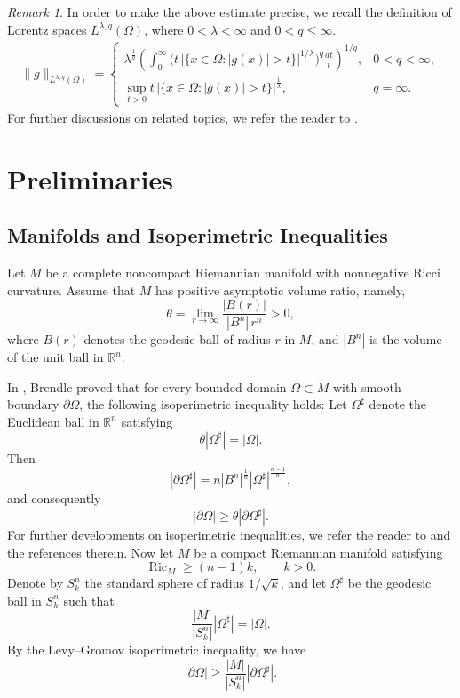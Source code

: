 \documentclass[11pt]{article}
\numberwithin{equation}{section}
\theoremstyle{definition}
\theoremstyle{remark}
\newtheorem{remark}[theorem]{Remark}
\begin{document}
\begin{remark}
In order to make the above estimate precise, 
we recall the definition of Lorentz spaces $L^{\lambda,q}(\Omega)$, 
where $0<\lambda<\infty$ and $0<q\le\infty$.
\begin{align*}
\|g\|_{L^{\lambda,q}(\Omega)}
=
\begin{cases}
  \lambda^{\frac{1}{q}}
\left(
\displaystyle \int_0^\infty
\big(t\,|\{x\in\Omega: |g(x)|>t\}|^{1/\lambda}\big)^q \frac{dt}{t}
\right)^{1/q}, & 0<q<\infty,\\[1em]
\sup_{t>0} t\,|\{x\in\Omega: |g(x)|>t\}|^\frac1\lambda, & q=\infty.
\end{cases}
\end{align*}
For further discussions on related topics, we refer the reader to
\cite{kaminska1990some,carro2007recent}.
\end{remark}
\section{Preliminaries}
\subsection{Manifolds and Isoperimetric Inequalities}
Let $M$ be a complete noncompact Riemannian manifold with nonnegative Ricci curvature. Assume that $M$ has positive asymptotic volume ratio, namely,
\begin{equation}
\theta
=
\lim_{r\to\infty}
\frac{|B(r)|}{|B^n|\,r^n}
>0,
\end{equation}
where $B(r)$ denotes the geodesic ball of radius $r$ in $M$, and $|B^n|$ is the volume of the unit ball in $\mathbb{R}^n$.

In \cite{brendle2023sobolev}, Brendle proved that for every bounded domain $\Omega\subset M$ with smooth boundary $\partial\Omega$, the following isoperimetric inequality holds:
Let $\Omega^\sharp$ denote the Euclidean ball in $\mathbb{R}^n$ satisfying
\[
\theta |\Omega^\sharp| = |\Omega|.
\]
Then
\[
|\partial \Omega^\sharp|
=
n|B^n|^{\frac1n}
|\Omega^\sharp|^{\frac{n-1}{n}},
\]
and consequently
\[
|\partial \Omega|
\ge
\theta |\partial \Omega^\sharp|.
\]
For further developments on isoperimetric inequalities, we refer the reader to
\cite{agostiniani2018sharp,cavalletti2017sharp,klartag2017needle}
and the references therein.
Now let $M$ be a compact Riemannian manifold satisfying
\[
\operatorname{Ric}_M \ge (n-1)k,
\qquad k>0.
\]
Denote by $S_k^n$ the standard sphere of radius $1/\sqrt{k}$, and let $\Omega^\sharp$ be the geodesic ball in $S_k^n$ such that
\[
\frac{|M|}{|S_k^n|}
|\Omega^\sharp|
=
|\Omega|.
\]
By the Levy--Gromov isoperimetric inequality\cite{gromov2007metric}, we have
\[
|\partial \Omega|
\ge
\frac{|M|}{|S_k^n|}
|\partial \Omega^\sharp|.
\]
\end{document}
